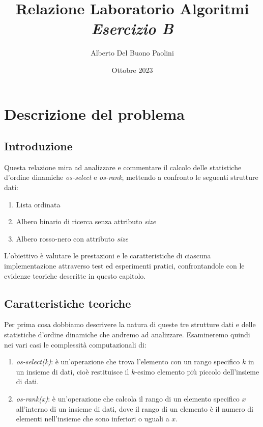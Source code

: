 \documentclass[onecolumn]{article}
\title{Relazione Laboratorio Algoritmi\\\textit{Esercizio B}}
\author{Alberto Del Buono Paolini}
\date{Ottobre 2023}
\begin{document}
\begin{onecolumn}
\vspace*{-4em}
{\let\newpage\relax\maketitle}
\tableofcontents
\end{onecolumn}
\vspace{1cm}
\pagebreak

\section{Descrizione del problema}

\subsection{Introduzione}
Questa relazione mira ad analizzare e commentare il calcolo delle statistiche d'ordine dinamiche \textit{os-select} e \textit{os-rank}, mettendo a confronto le seguenti strutture dati: 
\begin{enumerate}
\setlength\itemsep{-0.25em}
    \item Lista ordinata
    \item Albero binario di ricerca senza attributo \textit{size}
    \item Albero rosso-nero con attributo \textit{size}
\end{enumerate}

L'obiettivo è valutare le prestazioni e le caratteristiche di ciascuna implementazione attraverso test ed esperimenti pratici, confrontandole con le evidenze teoriche descritte in questo capitolo.

\subsection{Caratteristiche teoriche}

Per prima cosa dobbiamo descrivere la natura di queste tre strutture dati e delle statistiche d'ordine dinamiche che andremo ad analizzare. Esamineremo quindi nei vari casi le complessità computazionali di:

\begin{enumerate}
\setlength\itemsep{-0.25em}
    \item \textit{os-select(k)}: è un'operazione che trova l'elemento con un rango specifico $k$ in un insieme di dati, cioè restituisce il $k$-esimo elemento più piccolo dell'insieme di dati.
    \item \textit{os-rank(x)}: è un'operazione che calcola il rango di un elemento specifico $x$ all'interno di un insieme di dati, dove il rango di un elemento è il numero di elementi nell'insieme che sono inferiori o uguali a $x$.
\end{enumerate}
\end{document}
